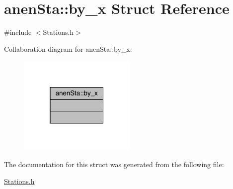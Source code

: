 \hypertarget{structanen_sta_1_1by__x}{}\section{anen\+Sta\+:\+:by\+\_\+x Struct Reference}
\label{structanen_sta_1_1by__x}


{\ttfamily \#include $<$Stations.\+h$>$}



Collaboration diagram for anen\+Sta\+:\+:by\+\_\+x\+:\nopagebreak
\begin{figure}[H]
\begin{center}
\leavevmode
\includegraphics[width=160pt]{structanen_sta_1_1by__x__coll__graph}
\end{center}
\end{figure}


The documentation for this struct was generated from the following file\+:\begin{DoxyCompactItemize}
\item 
\mbox{\hyperlink{_stations_8h}{Stations.\+h}}\end{DoxyCompactItemize}
